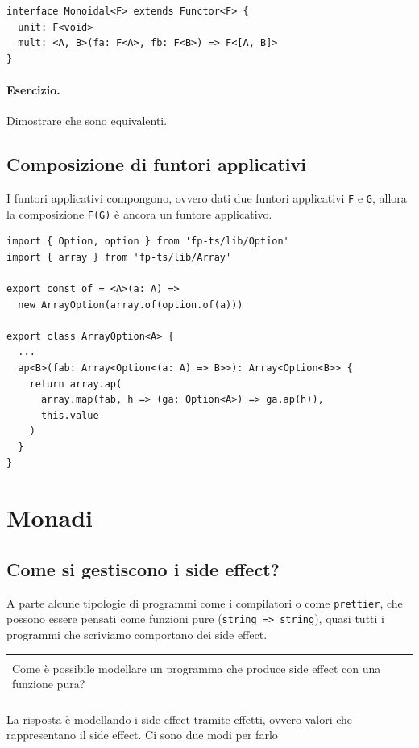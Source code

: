 \documentclass[12pt]{article}
\newenvironment{demo}
    {\begin{center}
    \begin{tabular}{|p{0.9\textwidth}|}
    \hline\\
    }
    {
    \\\\\hline
    \end{tabular}
    \end{center}
    }
\begin{document}
\begin{verbatim}
interface Monoidal<F> extends Functor<F> {
  unit: F<void>
  mult: <A, B>(fa: F<A>, fb: F<B>) => F<[A, B]>
}
\end{verbatim}

\paragraph{Esercizio.} Dimostrare che sono equivalenti.

\subsection{Composizione di funtori applicativi}

I funtori applicativi compongono, ovvero dati due funtori applicativi \texttt{F} e \texttt{G},
allora la composizione \texttt{F(G)} è ancora un funtore applicativo.

\begin{verbatim}
import { Option, option } from 'fp-ts/lib/Option'
import { array } from 'fp-ts/lib/Array'

export const of = <A>(a: A) =>
  new ArrayOption(array.of(option.of(a)))

export class ArrayOption<A> {
  ...
  ap<B>(fab: Array<Option<(a: A) => B>>): Array<Option<B>> {
    return array.ap(
      array.map(fab, h => (ga: Option<A>) => ga.ap(h)),
      this.value
    )
  }
}
\end{verbatim}

\newpage

\section{Monadi}

\subsection{Come si gestiscono i side effect?}

A parte alcune tipologie di programmi come i compilatori o come \texttt{prettier}, che possono essere pensati come funzioni pure (\texttt{string => string}),
quasi tutti i programmi che scriviamo comportano dei side effect.

\begin{demo}
Come è possibile modellare un programma che produce side effect con una funzione pura?
\end{demo}

La risposta è modellando i side effect tramite effetti, ovvero valori che rappresentano il side effect. Ci sono due modi per farlo
\end{document}

